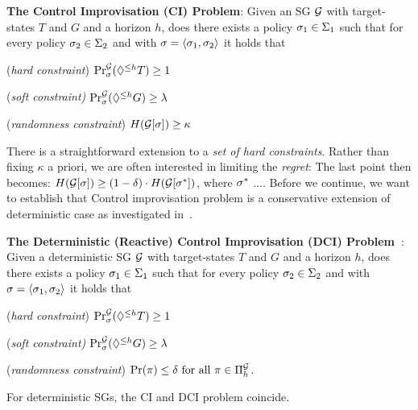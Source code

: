 \begin{mdframed}[backgroundcolor=blue!5]
\textbf{The Control Improvisation (CI) Problem}:
Given an SG $\sg$ with target-states $T$ and $G$ and a horizon $h$, does there exists a policy $\sched_1 \in \Sched_1$  such that for every policy $\sched_2 \in \Sched_2$ and with $\sched = \langle \sched_1, \sched_2 \rangle$ it holds that 
\begin{compactenum}
	\item (\emph{hard constraint}) $\Pr^\sg_{\sched}(\eventually{h} T) \geq 1$
	\item (\emph{soft constraint)} $\Pr^\sg_{\sched}(\eventually{h} G) \geq \lambda$
	\item (\emph{randomness constraint}) $H(\sg[\sched]) \geq \kappa$
\end{compactenum}
\end{mdframed}
There is a straightforward extension to a \emph{set of hard constraints}.
Rather than fixing $\kappa$ a priori, we are often interested in limiting the \emph{regret}: The last point then becomes:
$H(\sg[\sched]) \geq (1-\delta) \cdot H(\sg[\sched^{*}])$, where $\sched^{*}$ ....  
Before we continue, we want to establish that Control improvisation problem is a conservative extension of deterministic case as investigated in~\cite{}.
\begin{mdframed}
\textbf{The Deterministic (Reactive) Control Improvisation (DCI) Problem~\cite{}}:
Given a deterministic SG $\sg$ with target-states $T$ and $G$ and a horizon $h$, does there exists a policy $\sched_1 \in \Sched_1$  such that for every policy $\sched_2 \in \Sched_2$ and with $\sched = \langle \sched_1, \sched_2 \rangle$ it holds that 
\begin{compactenum}
	\item (\emph{hard constraint}) $\Pr^\sg_{\sched}(\eventually{h} T) \geq 1$
	\item (\emph{soft constraint)} $\Pr^\sg_{\sched}(\eventually{h} G) \geq \lambda$
	\item (\emph{randomness constraint}) $\Pr(\pi) \leq \delta \text{ for all } \pi \in \Paths[h]{\sg}$.
\end{compactenum}
\end{mdframed}

\begin{theorem}
	For deterministic SGs, the CI and DCI problem coincide.
\end{theorem}





